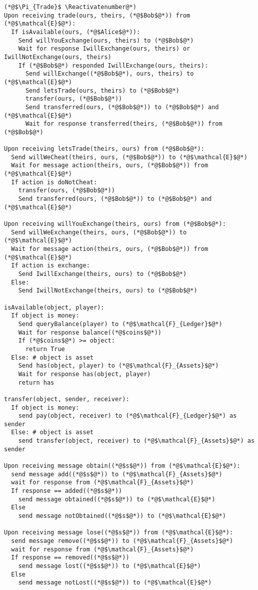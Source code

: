 \Suppressnumber
\begin{lstlisting}[label=tradeprot, style=numbers]
(*@$\Pi_{Trade}$ \Reactivatenumber@*)
Upon receiving trade(ours, theirs, (*@$Bob$@*)) from (*@$\mathcal{E}$@*):
  If isAvailable(ours, (*@$Alice$@*)):
    Send willYouExchange(ours, theirs) to (*@$Bob$@*)
    Wait for response IwillExchange(ours, theirs) or IwillNotExchange(ours, theirs)
    If (*@$Bob$@*) responded IwillExchange(ours, theirs):
      Send willExchange((*@$Bob$@*), ours, theirs) to (*@$\mathcal{E}$@*)
      Send letsTrade(ours, theirs) to (*@$Bob$@*)
      transfer(ours, (*@$Bob$@*))
      Send transferred(ours, (*@$Bob$@*)) to (*@$Bob$@*) and (*@$\mathcal{E}$@*)
      Wait for response transferred(theirs, (*@$Bob$@*)) from (*@$Bob$@*)

Upon receiving letsTrade(theirs, ours) from (*@$Bob$@*):
  Send willWeCheat(theirs, ours, (*@$Bob$@*)) to (*@$\mathcal{E}$@*)
  Wait for message action(theirs, ours, (*@$Bob$@*)) from (*@$\mathcal{E}$@*)
  If action is doNotCheat:
    transfer(ours, (*@$Bob$@*))
    Send transferred(ours, (*@$Bob$@*)) to (*@$Bob$@*) and (*@$\mathcal{E}$@*)

Upon receiving willYouExchange(theirs, ours) from (*@$Bob$@*):
  Send willWeExchange(theirs, ours, (*@$Bob$@*)) to (*@$\mathcal{E}$@*)
  Wait for message action(theirs, ours, (*@$Bob$@*)) from (*@$\mathcal{E}$@*)
  If action is exchange:
    Send IwillExchange(theirs, ours) to (*@$Bob$@*)
  Else:
    Send IwillNotExchange(theirs, ours) to (*@$Bob$@*)

isAvailable(object, player):
  If object is money:
    Send queryBalance(player) to (*@$\mathcal{F}_{Ledger}$@*)
    Wait for response balance((*@$coins$@*))
    If (*@$coins$@*) >= object:
      return True
  Else: # object is asset
    Send has(object, player) to (*@$\mathcal{F}_{Assets}$@*)
    Wait for response has(object, player)
    return has

transfer(object, sender, receiver):
  If object is money:
    send pay(object, receiver) to (*@$\mathcal{F}_{Ledger}$@*) as sender
  Else: # object is asset
    send transfer(object, receiver) to (*@$\mathcal{F}_{Assets}$@*) as sender

Upon receiving message obtain((*@$s$@*)) from (*@$\mathcal{E}$@*):
  send message add((*@$s$@*)) to (*@$\mathcal{F}_{Assets}$@*)
  wait for response from (*@$\mathcal{F}_{Assets}$@*)
  If response == added((*@$s$@*))
    send message obtained((*@$s$@*)) to (*@$\mathcal{E}$@*)
  Else
    send message notObtained((*@$s$@*)) to (*@$\mathcal{E}$@*)

Upon receiving message lose((*@$s$@*)) from (*@$\mathcal{E}$@*):
  send message remove((*@$s$@*)) to (*@$\mathcal{F}_{Assets}$@*)
  wait for response from (*@$\mathcal{F}_{Assets}$@*)
  If response == removed((*@$s$@*))
    send message lost((*@$s$@*)) to (*@$\mathcal{E}$@*)
  Else
    send message notLost((*@$s$@*)) to (*@$\mathcal{E}$@*)
\end{lstlisting}
